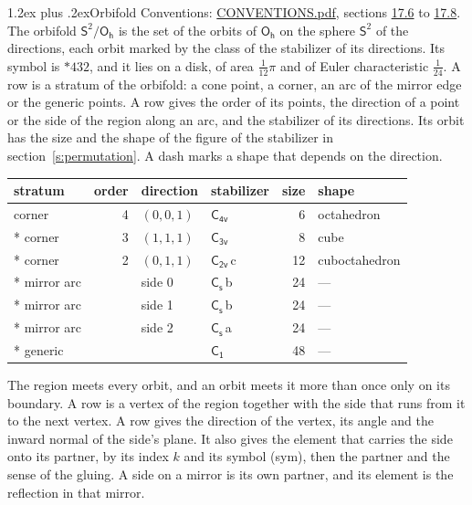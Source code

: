\documentclass[10pt,a4paper]{article}
\makeatletter
\renewcommand\section{\@startsection{section}{1}{\z@}{-3ex plus -1ex minus -.2ex}%
  {1.2ex plus .2ex}{\normalfont\large\sffamily\bfseries\color{parttitle}}}
\numberwithin{equation}{section}
\newcommand{\grp}[1]{\mathsf{#1}}
\newcommand{\orbname}[1]{#1}
\newcommand{\clsletter}[1]{\,{\scriptsize\color{black!55}#1}}
\newcommand{\dirvec}[3]{(#1, #2, #3)}
\newcommand{\twosphere}{\mathsf{S}^{2}}
\makeatother
\begin{document}
\section{Orbifold}\label{s:orbifold}
Conventions: \href{../../CONVENTIONS.pdf}{CONVENTIONS.pdf}, sections \href{../../CONVENTIONS.pdf\#conv.17.6}{17.6} to \href{../../CONVENTIONS.pdf\#conv.17.8}{17.8}.
The orbifold $\twosphere/\grp{O_{h}}$ is the set of the orbits of $\grp{O_{h}}$ on the sphere $\twosphere$ of the directions, each orbit marked by the class of the stabilizer of its directions. Its symbol is $\orbname{{\ast}432}$, and it lies on a disk, of area $\tfrac{1}{12}\pi$ and of Euler characteristic $\tfrac{1}{24}$.
\leavevmode\label{n:head.stratum}\label{n:head.order.point}\label{n:head.direction}\label{n:head.stabilizer}\label{n:head.size.orbit}\label{n:head.shape}A row is a stratum of the orbifold: a cone point, a corner, an arc of the mirror edge or the generic points. A row gives the order of its points, the direction of a point or the side of the region along an arc, and the stabilizer of its directions. Its orbit has the size and the shape of the figure of the stabilizer in section~\ref{s:permutation}. A dash marks a shape that depends on the direction.
{\small\setlength{\tabcolsep}{4pt}\begin{longtable}{@{}lrllrl@{}}\toprule
stratum & order & direction & stabilizer & size & shape\\\midrule\endhead
\bottomrule\endfoot\endlastfoot
corner & 4 & $\dirvec{0}{0}{1}$ & \href{C4v.pdf}{$\grp{C_{4v}}$} & 6 & octahedron\\*
corner & 3 & $\dirvec{1}{1}{1}$ & \href{C3v.pdf}{$\grp{C_{3v}}$} & 8 & cube\\*
corner & 2 & $\dirvec{0}{1}{1}$ & \href{C2v.pdf}{$\grp{C_{2v}}$}\clsletter{c} & 12 & cuboctahedron\\*
mirror arc &  & side 0 & \href{C1v.pdf}{$\grp{C_{s}}$}\clsletter{b} & 24 & ---\\*
mirror arc &  & side 1 & \href{C1v.pdf}{$\grp{C_{s}}$}\clsletter{b} & 24 & ---\\*
mirror arc &  & side 2 & \href{C1v.pdf}{$\grp{C_{s}}$}\clsletter{a} & 24 & ---\\*
generic &  &  & \href{C1.pdf}{$\grp{C_{1}}$} & 48 & ---\\
\bottomrule\end{longtable}}
\leavevmode\label{n:head.vertex.region}\label{n:head.angle}\label{n:head.normal.side}\label{n:head.partner}\label{n:head.sense}The region meets every orbit, and an orbit meets it more than once only on its boundary. A row is a vertex of the region together with the side that runs from it to the next vertex. A row gives the direction of the vertex, its angle and the inward normal of the side's plane. It also gives the element that carries the side onto its partner, by its index $k$ and its symbol (sym), then the partner and the sense of the gluing. A side on a mirror is its own partner, and its element is the reflection in that mirror.
\end{document}
